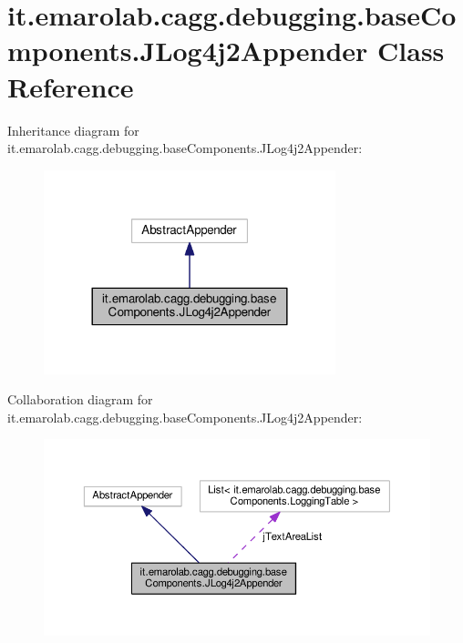 \hypertarget{classit_1_1emarolab_1_1cagg_1_1debugging_1_1baseComponents_1_1JLog4j2Appender}{\section{it.\-emarolab.\-cagg.\-debugging.\-base\-Components.\-J\-Log4j2\-Appender Class Reference}
\label{classit_1_1emarolab_1_1cagg_1_1debugging_1_1baseComponents_1_1JLog4j2Appender}
}


Inheritance diagram for it.\-emarolab.\-cagg.\-debugging.\-base\-Components.\-J\-Log4j2\-Appender\-:\nopagebreak
\begin{figure}[H]
\begin{center}
\leavevmode
\includegraphics[width=240pt]{classit_1_1emarolab_1_1cagg_1_1debugging_1_1baseComponents_1_1JLog4j2Appender__inherit__graph}
\end{center}
\end{figure}


Collaboration diagram for it.\-emarolab.\-cagg.\-debugging.\-base\-Components.\-J\-Log4j2\-Appender\-:\nopagebreak
\begin{figure}[H]
\begin{center}
\leavevmode
\includegraphics[width=350pt]{classit_1_1emarolab_1_1cagg_1_1debugging_1_1baseComponents_1_1JLog4j2Appender__coll__graph}
\end{center}
\end{figure}
